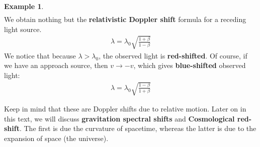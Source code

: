 \documentclass{article}
\theoremstyle{definition}
\newtheorem{exmp}{Example}[section]
\begin{document}
\begin{exmp}
\begin{align*}
	\end{align*}
	We obtain nothing but the \textbf{relativistic Doppler shift} formula for a receding light source. 
	\begin{align*}
	\boxed{\lambda = \lambda_0 \sqrt{\frac{1+\beta}{1-\beta}}}
	\end{align*}
	We notice that because $\lambda > \lambda_0$, the observed light is \textbf{red-shifted}. Of course, if we have an approach source, then $v \rightarrow -v$, which gives \textbf{blue-shifted} observed light:
	\begin{align*}
	\boxed{\lambda = \lambda_0\sqrt{\frac{1-\beta}{1+\beta}}}
	\end{align*}
\end{exmp}

Keep in mind that these are Doppler shifts due to relative motion. Later on in this text, we will discuss \textbf{gravitation spectral shifts} and \textbf{Cosmological red-shift}. The first is due the curvature of spacetime, whereas the latter is due to the expansion of space (the universe).\\
\end{document}
